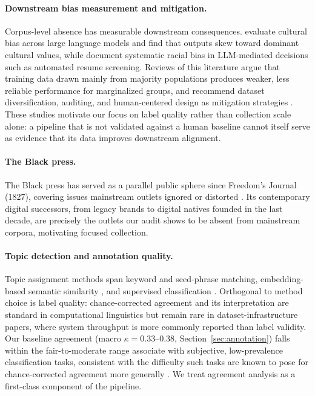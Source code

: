 \documentclass[letterpaper]{article}
\begin{document}
\paragraph{Downstream bias measurement and mitigation.}
Corpus-level absence has measurable downstream consequences.
\citet{tao2024} evaluate cultural bias across large language models and
find that outputs skew toward dominant cultural values, while
\citet{an2025} document systematic racial bias in LLM-mediated decisions
such as automated resume screening. Reviews of this literature argue that
training data drawn mainly from majority populations produces weaker,
less reliable performance for marginalized groups, and recommend dataset
diversification, auditing, and human-centered design as mitigation
strategies \citep{kostickquenet2022,chen2023}. These studies motivate our
focus on label quality rather than collection scale alone: a pipeline
that is not validated against a human baseline cannot itself serve as
evidence that its data improves downstream alignment.

\paragraph{The Black press.}
The Black press has served as a parallel public sphere since Freedom's
Journal (1827), covering issues mainstream outlets ignored or distorted
\citep{washburn2006}. Its contemporary digital successors, from legacy
brands to digital natives founded in the last decade, are precisely the
outlets our audit shows to be absent from mainstream corpora, motivating
focused collection.

\paragraph{Topic detection and annotation quality.}
Topic assignment methods span keyword and seed-phrase matching,
embedding-based semantic similarity \citep{reimers2019}, and supervised
classification \citep{pedregosa2011}. Orthogonal to method choice is
label quality: chance-corrected agreement \citep{cohen1960} and its
interpretation \citep{landis1977,artstein2008} are standard in
computational linguistics but remain rare in dataset-infrastructure
papers, where system throughput is more commonly reported than label
validity. Our baseline agreement (macro $\kappa = 0.33$--$0.38$,
Section~\ref{sec:annotation}) falls within the fair-to-moderate range
\citet{landis1977} associate with subjective, low-prevalence
classification tasks, consistent with the difficulty such tasks are
known to pose for chance-corrected agreement more generally
\citep{artstein2008}. We treat agreement analysis as a first-class
component of the pipeline.
\end{document}
